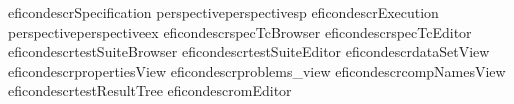 
\begin{gdreficon}
  \app{}eficondescr{Specification perspective}{perspectivesp}
  \app{}eficondescr{Execution perspective}{perspectiveex}
  \app{}eficondescr{\gdtestcasebrowser}{specTcBrowser}
  \app{}eficondescr{\gdtestcaseeditor}{specTcEditor}
  \app{}eficondescr{\gdtestsuitebrowser}{testSuiteBrowser}
  \app{}eficondescr{\gdtestsuiteeditor}{testSuiteEditor}
  \app{}eficondescr{\gddatasetsview}{dataSetView}
  \app{}eficondescr{\gdpropview}{propertiesView}
  \app{}eficondescr{\gdprobview}{problems_view}
  \app{}eficondescr{\gdcompnamesview}{compNamesView}
  \app{}eficondescr{\gdtestresultview}{testResultTree}
  \app{}eficondescr{\gdomeditor}{omEditor}
\end{gdreficon}



